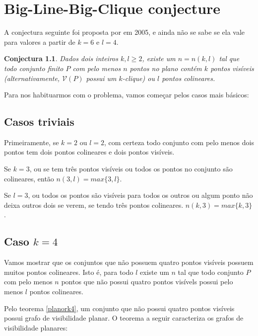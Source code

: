 \documentclass[a4paper]{book}
\newtheorem{conjectura}{Conjectura}
\begin{document}
\chapter{Big-Line-Big-Clique conjecture}
A conjectura seguinte foi proposta por \cite{visibilitygraph} em 2005, e ainda não se sabe se ela vale para valores a partir de  $k=6$ e $l=4$.
\begin{conjectura}\label{conj1}
    Dados dois inteiros $k,l\geq2$, existe um $n=n(k,l)$ tal que todo conjunto finito $P$ com pelo menos $n$ pontos no plano contém $k$ pontos visíveis (alternativamente, $\mathcal V(P)$ possui um $k$-clique) ou $l$ pontos colineares.
\end{conjectura}

Para nos habituarmos com o problema, vamos começar pelos casos mais básicos:

\section{Casos triviais}
Primeiramente, se $k=2$ ou $l=2$, com certeza todo conjunto com pelo menos dois pontos tem dois pontos colineares e dois pontos visíveis.

Se $k=3$, ou se tem três pontos visíveis ou todos os pontos no conjunto são colineares, então $n(3,l)=max\{3,l\}$.

Se $l=3$, ou todos os pontos são visíveis para todos os outros ou algum ponto não deixa outros dois se verem, se tendo três pontos colineares. $n(k,3) = max\{k,3\}$.


\section{Caso $k=4$}
Vamos mostrar que os conjuntos que não possuem quatro pontos visíveis possuem muitos pontos colineares. Isto é, para todo $l$ existe um $n$ tal que todo conjunto $P$ com pelo menos $n$ pontos que não possui quatro pontos visívels possui pelo menos $l$ pontos colineares.

Pelo teorema \ref{planork4}, um conjunto que não possui quatro pontos visíveis possui grafo de visibilidade planar. O teorema a seguir caracteriza os grafos de visibilidade planares:
\end{document}

